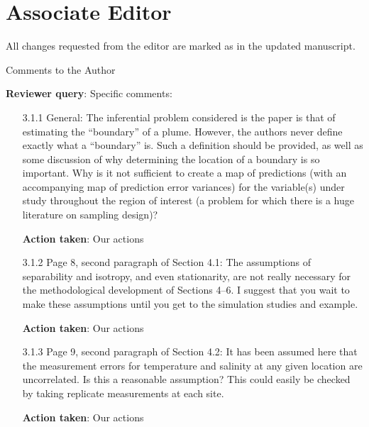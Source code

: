 \documentclass[a4paper]{article}
\def\reply{\textbf{Reviewer query}}
\def\action{\textbf{Action taken}}
\newcommand{\edcomment}[1]{{\color{green}{\{Editor: #1\}}}}
\begin{document}
 \section*{Associate Editor}
All changes requested from the editor are marked as \edcomment{green text}
in the updated manuscript. 

\begin{answers}

\item{Comments to the Author}\label{q30}

\reply: Specific comments:

\begin{itemize}[noitemsep,topsep=0pt,parsep=0pt,partopsep=0pt]

\item[3.1.1] General: The inferential problem considered is the paper is that of estimating the “boundary”
of a plume. However, the authors never define exactly what a “boundary” is. Such a definition
should be provided, as well as some discussion of why determining the location of a boundary
is so important. Why is it not sufficient to create a map of predictions (with an accompanying
map of prediction error variances) for the variable(s) under study throughout the region of
interest (a problem for which there is a huge literature on sampling design)?\par
\action: Our actions
\vspace{1em}

\item[3.1.2] Page 8, second paragraph of Section 4.1: The assumptions of separability and isotropy, and even stationarity, are not really necessary for the methodological development of Sections 4–6.
I suggest that you wait to make these assumptions until you get to the simulation studies and
example.\par
\action: Our actions
\vspace{1em}

\item[3.1.3] Page 9, second paragraph of Section 4.2: It has been assumed here that the measurement
errors for temperature and salinity at any given location are uncorrelated. Is this a reasonable
assumption? This could easily be checked by taking replicate measurements at each site.\par
\action: Our actions
\vspace{1em}


\end{itemize}
\end{answers}
\end{document}
